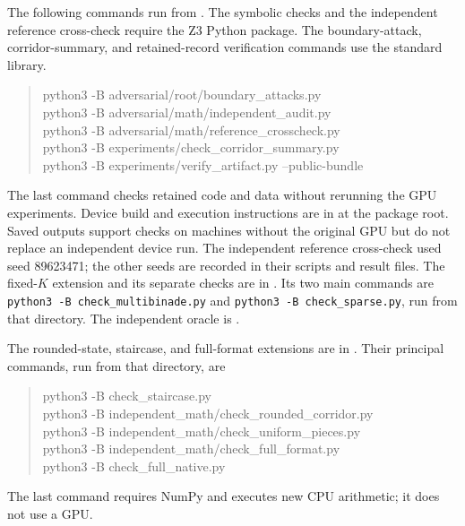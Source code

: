\documentclass[11pt,reqno]{amsart}
\theoremstyle{definition}
\theoremstyle{remark}
\numberwithin{equation}{section}
\begin{document}
The following commands run from . The symbolic checks and
the independent reference cross-check require the Z3 Python package. The
boundary-attack, corridor-summary, and retained-record verification commands
use the standard library.
\begin{quote}\footnotesize\ttfamily
python3 -B adversarial/root/boundary\_attacks.py\\
python3 -B adversarial/math/independent\_audit.py\\
python3 -B adversarial/math/reference\_crosscheck.py\\
python3 -B experiments/check\_corridor\_summary.py\\
python3 -B experiments/verify\_artifact.py --public-bundle
\end{quote}
The last command checks retained code and data without rerunning the GPU
experiments. Device build and execution instructions are in
 at the package root. Saved outputs support checks on
machines without the original GPU but do not replace an independent device
run. The independent reference cross-check used seed 89623471; the other
seeds are recorded in their scripts and result files. The fixed-$K$
extension and its separate checks are in
. Its two main commands
are \texttt{python3 -B check\_multibinade.py} and
\texttt{python3 -B check\_sparse.py}, run from that directory. The independent
oracle is .

The rounded-state, staircase, and full-format extensions are in
. Their principal
commands, run from that directory, are
\begin{quote}\small\ttfamily
python3 -B check\_staircase.py\\
python3 -B independent\_math/check\_rounded\_corridor.py\\
python3 -B independent\_math/check\_uniform\_pieces.py\\
python3 -B independent\_math/check\_full\_format.py\\
python3 -B check\_full\_native.py
\end{quote}
The last command requires NumPy and executes new CPU arithmetic; it does
not use a GPU.
\end{document}

